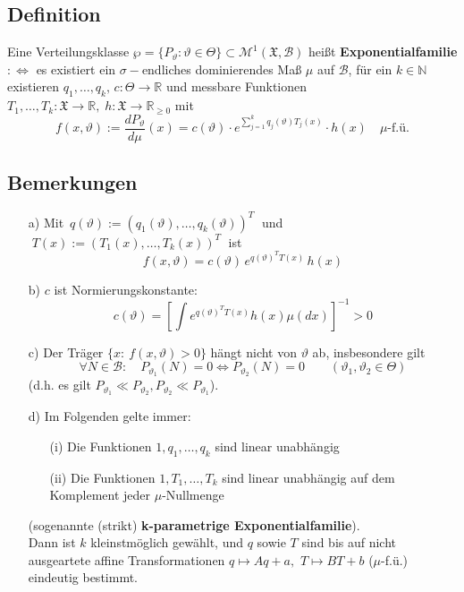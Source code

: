 \documentclass[a4paper,11pt,twoside,titlepage]{article}
\newcommand{\R}{{\mathbb R}}
\newcommand{\N}{{\mathbb N}}
\newcommand{\XX}{{\mathfrak X}} %
\newcommand{\MM}{{\mathcal M}}
\newcommand\BB{ \mathcal{B} } %
\begin{document}
\subsection{Definition}
Eine Verteilungsklasse $\wp = \{ P_{\vartheta}: \vartheta\in\Theta \} \subset \MM^1(\XX,\BB)$
heißt {\bf Exponentialfamilie} $:\Leftrightarrow$ es existiert ein $\sigma-$endliches dominierendes Maß $\mu$ auf $\BB$, für ein $k\in\N$ existieren $q_1,\ldots,q_k, \, c:\Theta\rightarrow \R$
und messbare Funktionen $T_1,\ldots,T_k : \XX\rightarrow\R, \; h:\XX \rightarrow \R_{\geq 0}$ mit
\[
 f(x,\vartheta) :=  \frac{d P_\vartheta}{d\mu}(x) = c(\vartheta) \cdot e^{\sum_{j=1}^k q_j(\vartheta)T_j(x)} \cdot h(x) \quad \mu\mbox{-f.ü}.\]


\subsection{Bemerkungen}
\begin{itemize}
   \item[a)] Mit $\, q(\vartheta) := \left(q_1(\vartheta),\ldots,q_k(\vartheta)\right)^{T} \;$
    und $\; T(x) := (T_1(x),\ldots,T_k(x))^{T} \;$ ist
    \[f(x,\vartheta) = c(\vartheta) \, e^{q(\vartheta)^{T} T(x)} \, h(x)\]
  \item[b)] $c$ ist Normierungskonstante:
    \[c(\vartheta) = \left[\int e^{q(\vartheta)^{T} T(x)} h(x) \mu(dx)\right]^{-1} > 0\]
  \item[c)] Der Träger $\{ x :\ f(x,\vartheta)>0 \}$ hängt nicht von $\vartheta$ ab,
   insbesondere gilt
   \[ \forall N \in \BB: \quad P_{\vartheta_1}(N)=0 \Leftrightarrow P_{\vartheta_2}(N)=0
     \qquad (\vartheta_1, \vartheta_2 \in \Theta)\]
  (d.h. es gilt $P_{\vartheta_1} \ll P_{\vartheta_2}, P_{\vartheta_2} \ll P_{\vartheta_1}$).
  \item[d)]
   Im Folgenden gelte immer:
     \begin{itemize}
       \item[(i)]  Die Funktionen $1,q_1,\ldots,q_k$ sind linear unabh\"angig
       \item[(ii)] Die Funktionen $1,T_1,\ldots,T_k$ sind linear unabh\"angig
                auf dem\\ Komplement jeder $\mu$-Nullmenge
     \end{itemize}
   (sogenannte (strikt) {\bf k-parametrige Exponentialfamilie}). \\
   Dann ist $k$ kleinstmöglich gewählt, und $q$ sowie $T$ sind bis auf nicht
   ausgeartete affine Transformationen $q\mapsto Aq+a,$ $ T\mapsto BT+b$
   ($\mu$-f.ü.) eindeutig bestimmt.
\end{itemize}
\end{document}
